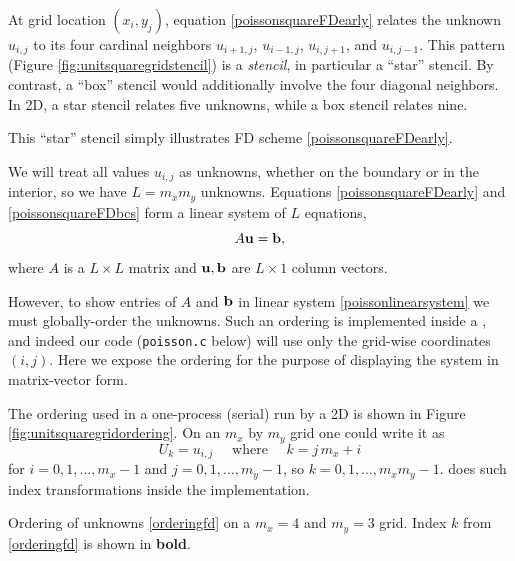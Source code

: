 At grid location $(x_i,y_j)$, equation \eqref{poissonsquareFDearly} relates the unknown $u_{i,j}$ to its four cardinal neighbors $u_{i+1,j}$, $u_{i-1,j}$, $u_{i,j+1}$, and $u_{i,j-1}$.  This pattern (Figure \ref{fig:unitsquaregridstencil}) is a \emph{stencil}, in particular a ``star'' stencil.  By contrast, a ``box'' stencil would additionally involve the four diagonal neighbors.  In 2D, a star stencil relates five unknowns, while a box stencil relates nine.

\begin{marginfigure}

\caption{This ``star'' stencil simply illustrates FD scheme \eqref{poissonsquareFDearly}.}
\label{fig:unitsquaregridstencil}
\end{marginfigure}

We will treat all values $u_{i,j}$ as unknowns, whether on the boundary or in the interior, so we have $L=m_x m_y$ unknowns.  Equations \eqref{poissonsquareFDearly} and \eqref{poissonsquareFDbcs} form a linear system of $L$ equations,
\begin{equation}
A \mathbf{u} = \mathbf{b}, \label{poissonlinearsystem}
\end{equation}
where $A$ is a $L\times L$ matrix and $\mathbf{u},\mathbf{b}$ are $L\times 1$ column vectors.

However, to show entries of $A$ and $\mathbf{b}$ in linear system \eqref{poissonlinearsystem} we must globally-order the unknowns.  Such an ordering is implemented inside a \PETSc \pDMDA, and indeed our code (\texttt{poisson.c} below) will use only the grid-wise coordinates $(i,j)$.  Here we expose the ordering for the purpose of displaying the system in matrix-vector form.

The ordering used in a one-process (serial) run by a 2D \pDMDA is shown in Figure \ref{fig:unitsquaregridordering}.  On an $m_x$ by $m_y$ grid one could write it as
\begin{equation}
    U_k = u_{i,j} \quad \text{ where } \quad k = j\,m_x + i \label{orderingfd}
\end{equation}
for $i=0,1,\dots,m_x-1$ and $j=0,1,\dots,m_y-1$, so $k=0,1,\dots,m_x m_y-1$.  \PETSc does such index transformations inside the \pDMDA implementation.

\begin{marginfigure}

\caption{Ordering of unknowns \eqref{orderingfd} on a $m_x=4$ and $m_y=3$ grid.  Index $k$ from \eqref{orderingfd} is shown in \textbf{bold}.}
\label{fig:unitsquaregridordering}
\end{marginfigure}

